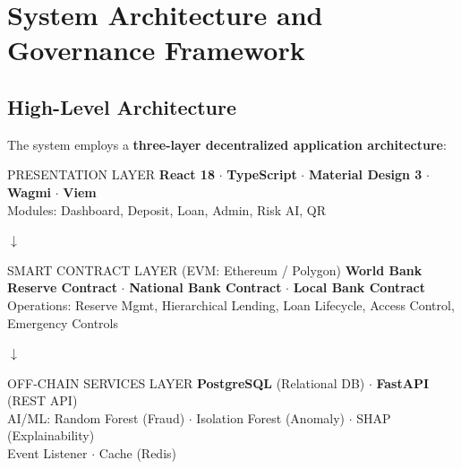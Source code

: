 \documentclass[11pt,a4paper]{article}
\begin{document}
\section{System Architecture and Governance Framework}

\subsection{High-Level Architecture}

The system employs a \textbf{three-layer decentralized application architecture}:

\vspace{6pt}
\begin{minipage}{\textwidth}
\begin{center}
\begin{layerbox}{PRESENTATION LAYER}
\textbf{React 18} \(\cdot\) \textbf{TypeScript} \(\cdot\) \textbf{Material Design 3} \(\cdot\) \textbf{Wagmi} \(\cdot\) \textbf{Viem}\\[4pt]
{\small Modules: Dashboard, Deposit, Loan, Admin, Risk AI, QR}
\end{layerbox}

\vspace{2pt}
{\Large\color{AccentBlue} $\boldsymbol{\downarrow}$}
\vspace{2pt}

\begin{layerbox}{SMART CONTRACT LAYER \normalfont\small(EVM: Ethereum / Polygon)}
\textbf{World Bank Reserve Contract} \(\cdot\) \textbf{National Bank Contract} \(\cdot\) \textbf{Local Bank Contract}\\[4pt]
{\small Operations: Reserve Mgmt, Hierarchical Lending, Loan Lifecycle, Access Control, Emergency Controls}
\end{layerbox}

\vspace{2pt}
{\Large\color{AccentBlue} $\boldsymbol{\downarrow}$}
\vspace{2pt}

\begin{layerbox}{OFF-CHAIN SERVICES LAYER}
\textbf{PostgreSQL} (Relational DB) \(\cdot\) \textbf{FastAPI} (REST API)\\[4pt]
{\small AI/ML: Random Forest (Fraud) \(\cdot\) Isolation Forest (Anomaly) \(\cdot\) SHAP (Explainability)}\\[2pt]
{\small Event Listener \(\cdot\) Cache (Redis)}
\end{layerbox}
\end{center}
\end{minipage}
\vspace{6pt}
\end{document}
